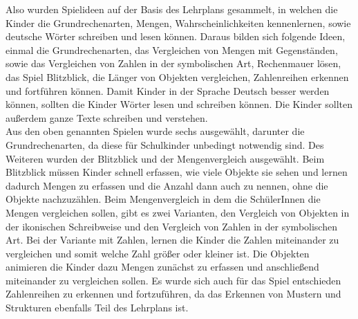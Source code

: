Also wurden Spielideen auf der Basis des Lehrplans gesammelt, in welchen die Kinder die Grundrechenarten, Mengen, Wahrscheinlichkeiten kennenlernen, sowie deutsche Wörter schreiben und lesen können. Daraus bilden sich folgende Ideen, einmal die Grundrechenarten, das Vergleichen von Mengen mit Gegenständen, sowie das Vergleichen von Zahlen in der symbolischen Art, Rechenmauer lösen, das Spiel Blitzblick, die Länger von Objekten vergleichen, Zahlenreihen erkennen und fortführen können. Damit Kinder in der Sprache Deutsch besser werden können, sollten die Kinder Wörter lesen und schreiben können. Die Kinder sollten außerdem ganze Texte schreiben und verstehen.\\
Aus den oben genannten Spielen wurde sechs ausgewählt, darunter die Grundrechenarten, da diese für Schulkinder unbedingt notwendig sind. Des Weiteren wurden der Blitzblick und der Mengenvergleich ausgewählt. Beim Blitzblick müssen Kinder schnell erfassen, wie viele Objekte sie sehen und lernen dadurch Mengen zu erfassen und die Anzahl dann auch zu nennen, ohne die Objekte nachzuzählen. Beim Mengenvergleich in dem die SchülerInnen die Mengen vergleichen sollen, gibt es zwei Varianten, den Vergleich von Objekten in der ikonischen Schreibweise und den Vergleich von Zahlen in der symbolischen Art. Bei der Variante mit Zahlen, lernen die Kinder die Zahlen miteinander zu vergleichen und somit welche Zahl größer oder kleiner ist. Die Objekten animieren die Kinder dazu Mengen zunächst zu erfassen und anschließend miteinander zu vergleichen sollen. Es wurde sich auch für das Spiel entschieden Zahlenreihen zu erkennen und fortzuführen, da das Erkennen von Mustern und Strukturen ebenfalls Teil des Lehrplans ist.
